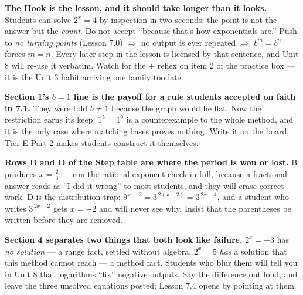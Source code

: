 \documentclass[10pt]{article}
\begin{document}
\begin{teachernote}
\textbf{The Hook is the lesson, and it should take longer than it looks.} Students can solve $2^{x}=4$
by inspection in two seconds; the point is not the answer but the \emph{count}. Do not accept ``because
that's how exponentials are.'' Push to \emph{no turning points} (Lesson 7.0) $\Rightarrow$ no output is
ever repeated $\Rightarrow$ $b^{m}=b^{n}$ forces $m=n$. Every later step in the lesson is licensed by
that sentence, and Unit 8 will re-use it verbatim. Watch for the $\pm$ reflex on item 2 of the practice
box --- it is the Unit 3 habit arriving one family too late.

\textbf{Section 1's $b=1$ line is the payoff for a rule students accepted on faith in 7.1.} They were
told $b\neq1$ because the graph would be flat. Now the restriction earns its keep: $1^{5}=1^{9}$ is a
counterexample to the whole method, and it is the only case where matching bases proves nothing. Write
it on the board; Tier E Part 2 makes students construct it themselves.

\textbf{Rows B and D of the Step table are where the period is won or lost.} B produces $x=\frac23$ ---
run the rational-exponent check in full, because a fractional answer reads as ``I did it wrong'' to most
students, and they will erase correct work. D is the distribution trap: $9^{\,x-2}=3^{\,2(x-2)}=3^{\,2x-4}$,
and a student who writes $3^{\,2x-2}$ gets $x=-2$ and will never see why. Insist that the parentheses
be written before they are removed.

\textbf{Section 4 separates two things that both look like failure.} $2^{x}=-3$ has \emph{no solution}
--- a range fact, settled without algebra. $2^{x}=5$ \emph{has} a solution that this method cannot
reach --- a method fact. Students who blur them will tell you in Unit 8 that logarithms ``fix'' negative
outputs. Say the difference out loud, and leave the three unsolved equations posted; Lesson 7.4 opens
by pointing at them.
\end{teachernote}
\end{document}
